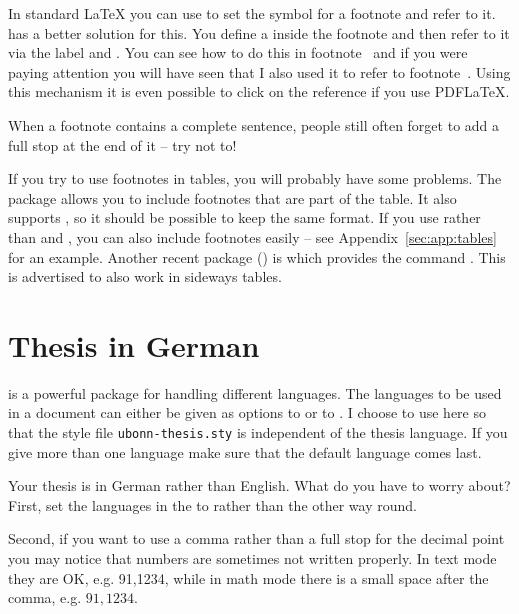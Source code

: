 In standard \LaTeX{} you can use
 to set the symbol for a
footnote and refer to it. \KOMAScript{} has a better solution for
this. You define a  inside the footnote and
then refer to it via the label and . You
can see how to do this in footnote~ and if you were
paying attention you will have seen that I also used it to refer to
footnote~. Using this mechanism it is even
possible to click on the reference if you use PDF\LaTeX.

When a footnote contains a complete sentence, people still often
forget to add a full stop at the end of it -- try not to!

If you try to use footnotes in tables, you will probably have some
problems. The  package allows you to include footnotes
that are part of the table. It also supports , so it
should be possible to keep the same format. If you use 
rather than  and , you can also include
footnotes easily -- see Appendix~\ref{sec:app:tables} for an
example. Another recent package () is
 which provides the command
. This is advertised to also work in sideways tables.


\section{Thesis in German}
\label{sec:layout:german}

 is a powerful package for handling different
languages. The languages to be used in a document can either be given
as options to  or to . I choose to
use  here so that the style file
\texttt{ubonn-thesis.sty} is independent of the thesis language. If
you give more than one language make sure that the default language
comes last.

Your thesis is in German rather than English. What do you have to
worry about? First, set the languages in the  to
 rather than the other way round.

Second, if you want to use a comma rather than a full stop for the
decimal point you may notice that numbers are sometimes not written
properly. In text mode they are OK, e.g. 91,1234, while in math mode
there is a small space after the comma, e.g. $91,1234$.

